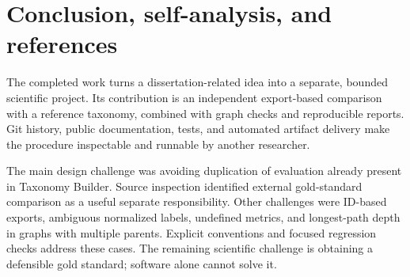 \documentclass[12pt,a4paper]{article}
\begin{document}
\clearpage
\section{Conclusion, self-analysis, and references}
The completed work turns a dissertation-related idea into a separate, bounded scientific project. Its contribution is an independent export-based comparison with a reference taxonomy, combined with graph checks and reproducible reports. Git history, public documentation, tests, and automated artifact delivery make the procedure inspectable and runnable by another researcher.

The main design challenge was avoiding duplication of evaluation already present in Taxonomy Builder. Source inspection identified external gold-standard comparison as a useful separate responsibility. Other challenges were ID-based exports, ambiguous normalized labels, undefined metrics, and longest-path depth in graphs with multiple parents. Explicit conventions and focused regression checks address these cases. The remaining scientific challenge is obtaining a defensible gold standard; software alone cannot solve it.
\end{document}
